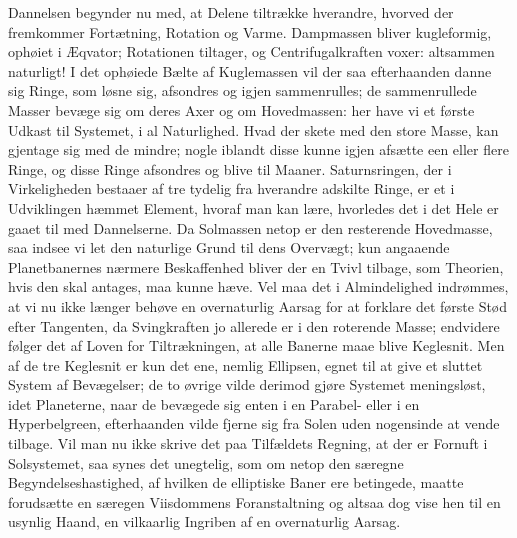 \documentclass[12pt,a4paper]{book}
\begin{document}
Dannelsen begynder nu med, at Delene tiltrække hverandre, hvorved der
fremkommer Fortætning, Rotation og Varme. Dampmassen bliver
kugleformig, ophøiet i Æqvator; Rotationen tiltager, og
Centrifugalkraften voxer: altsammen naturligt! I det ophøiede Bælte af
Kuglemassen vil der
saa efterhaanden danne sig Ringe, som løsne sig, afsondres og igjen
sammenrulles; de sammenrullede Masser bevæge sig om deres Axer og om
Hovedmassen: her have vi et første Udkast til Systemet, i al
Naturlighed. Hvad der skete med den store Masse, kan gjentage sig med
de mindre; nogle iblandt disse kunne igjen afsætte een eller flere
Ringe, og disse Ringe afsondres og blive til Maaner. Saturnsringen, der
i Virkeligheden bestaaer af tre tydelig fra hverandre adskilte Ringe, er
et i Udviklingen hæmmet Element, hvoraf man kan lære, hvorledes det i
det Hele er gaaet til med Dannelserne. Da Solmassen netop er den
resterende Hovedmasse, saa indsee vi let den naturlige Grund til dens
Overvægt; kun angaaende Planetbanernes nærmere Beskaffenhed bliver der
en Tvivl tilbage, som Theorien, hvis den skal antages, maa kunne hæve.
Vel maa det i Almindelighed indrømmes, at vi nu ikke længer behøve en
overnaturlig Aarsag for at forklare det første Stød efter Tangenten, da
Svingkraften jo allerede er i den roterende Masse; endvidere følger det
af Loven for Tiltrækningen, at alle Banerne maae blive Keglesnit. Men
af de tre Keglesnit er kun det ene, nemlig Ellipsen, egnet til at give
et sluttet System af Bevægelser; de to øvrige vilde derimod gjøre
Systemet meningsløst, idet Planeterne, naar de bevægede sig enten i en
Parabel- eller i en Hyperbelgreen, efterhaanden vilde fjerne sig fra
Solen uden nogensinde at vende tilbage. Vil man nu ikke skrive det paa
Tilfældets Regning, at der er Fornuft i Solsystemet, saa synes det
unegtelig, som om netop den særegne Begyndelseshastighed, af hvilken de
elliptiske Baner ere betingede, maatte forudsætte en særegen
Viisdommens Foranstaltning og altsaa dog vise hen til en usynlig Haand,
en vilkaarlig Ingriben af en overnaturlig Aarsag.
\end{document}
